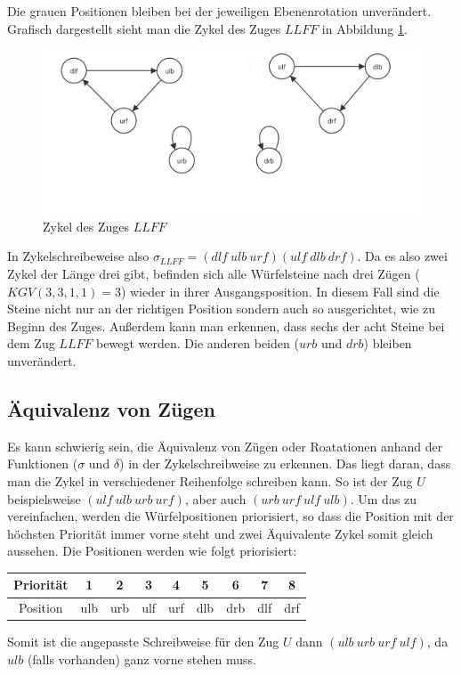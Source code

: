 \documentclass[12pt,a4paper, usenames, dvipsnames]{article}
\theoremstyle{mystyle}
\theoremstyle{definition}
\begin{document}
Die grauen Positionen bleiben bei der jeweiligen Ebenenrotation unverändert. 
Grafisch dargestellt sieht man die Zykel des Zuges $LLFF$ in Abbildung \ref{17}. 
\begin{figure}[H]
\centering
\includegraphics[scale=0.25]{zykel_LLFF.png}
\caption[Zykel des Zuges $LLFF$]{Zykel des Zuges $LLFF$}
\label{17}
\end{figure}
In Zykelschreibeweise also $\sigma_{LLFF}=(dlf \ ulb \ urf)(ulf \ dlb \ drf)$.
Da es also zwei Zykel der Länge drei gibt, befinden sich alle Würfelsteine nach drei Zügen ($KGV(3,3,1,1)=3$) wieder in ihrer Ausgangsposition. 
In diesem Fall sind die Steine nicht nur an der richtigen Position sondern auch so ausgerichtet, wie zu Beginn des Zuges. 
Außerdem kann man erkennen, dass sechs der acht Steine bei dem Zug $LLFF$ bewegt werden. Die anderen beiden ($urb$ und $drb$) bleiben unverändert. 

%
%
%
%
%
%
%
%
%
%
%
%
%
%
%
%
%
%
%
%
\subsection*{Äquivalenz von Zügen}


Es kann schwierig sein, die Äquivalenz von Zügen oder Roatationen anhand der Funktionen ($\sigma$ und $\delta$) in der Zykelschreibweise zu erkennen. 
Das liegt daran, dass man die Zykel in verschiedener Reihenfolge schreiben kann. So ist der Zug $U$ beispielsweise $ (ulf \ ulb \ urb \ urf)$, aber auch $(urb \ urf \ ulf \ ulb)$.
Um das zu vereinfachen, werden die Würfelpositionen priorisiert, so dass die Position mit der höchsten Priorität immer vorne steht und zwei Äquivalente Zykel somit gleich aussehen. 
Die Positionen werden wie folgt priorisiert:
\begin{center}
\begin{tabular}{ccccccccc}
Priorität & 1 & 2 & 3 & 4 & 5 & 6 & 7 & 8 \\
\hline
Position  & ulb & urb & ulf & urf & dlb & drb & dlf & drf \\
\end{tabular}
\end{center}
Somit ist die angepasste Schreibweise für den Zug $U$ dann $(ulb \ urb \ urf \ ulf)$, da $ulb$ (falls vorhanden) ganz vorne stehen muss.
\end{document}
